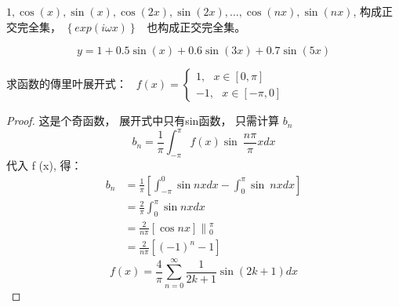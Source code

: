 \begin{note}
$	1, \cos(x), \sin (x), \cos(2x), \sin (2x), ..., \cos(nx), \sin (nx) $, 构成正交完全集，
$\left\{  exp(i\omega x)  \right\}$  也构成正交完全集。\\
\end{note}
\begin{equation*}
y=1 + 0.5\sin(x)+0.6\sin(3x)+0.7\sin(5x)
\end{equation*}    

\begin{example} %
求函数的傳里叶展开式：
    $\displaystyle f(x)=\begin{cases}
		1 , ~~~ x \in [0, \pi] \\
		-1 ,~~~ x \in [-\pi, 0] \
    \end{cases}$ \\
	\begin{proof} 
		这是个奇函数， 展开式中只有sin函数， 只需计算 $b_n$\\
		\begin{equation*}
	    b_n =\frac{1}{\pi}  \int_{-\pi}^{\pi}  f(x) \sin~ \frac{n\pi}{\pi} x dx  
        \end{equation*}     
        代入 f (x), 得：\\
		\begin{align*}
         b_n &=\frac{1}{\pi}  [ \int_{-\pi}^{0}  \sin n x dx - \int_{0}^{\pi}  \sin~nx dx] \\
                 &=\frac{2}{\pi}  \int_{0}^{\pi}  \sin nx dx  \\
                 &=\frac{2}{n\pi} [\cos nx] \left\|_0 ^\pi  \right. \\
                 &=\frac{2}{n\pi} [ (-1) ^n -1]
        \end{align*}
        	\begin{equation*}
        	f(x) = \frac{4}{\pi} \sum_{n=0}^{\infty}  \frac{1}{2k+1} \sin(2k+1) dx  
        \end{equation*}       
    	\end{proof}
\end{example}

